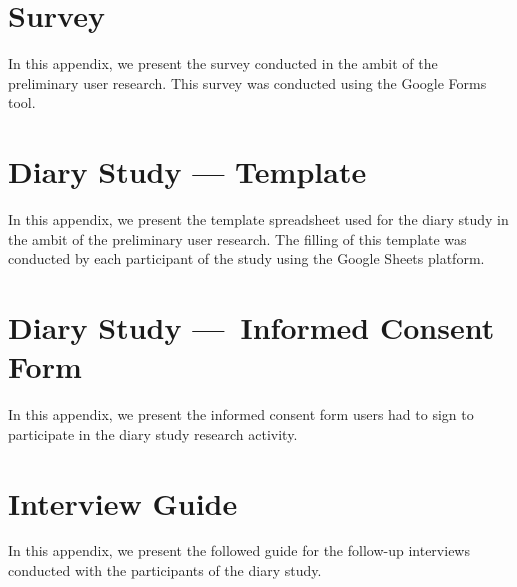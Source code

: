 \chapter{Survey}
\label{chapter:appendixA}

In this appendix, we present the survey conducted in the ambit of the preliminary user research. This survey was conducted using the Google Forms tool.




\chapter{Diary Study — Template}
\label{chapter:appendixB}

In this appendix, we present the template spreadsheet used for the diary study in the ambit of the preliminary user research. The filling of this template was conducted by each participant of the study using the Google Sheets platform.



\chapter{Diary Study — Informed Consent Form}
\label{chapter:appendixC}

In this appendix, we present the informed consent form users had to sign to participate in the diary study research activity.



\chapter{Interview Guide}
\label{chapter:appendixD}

In this appendix, we present the followed guide for the follow-up interviews conducted with the participants of the diary study.





